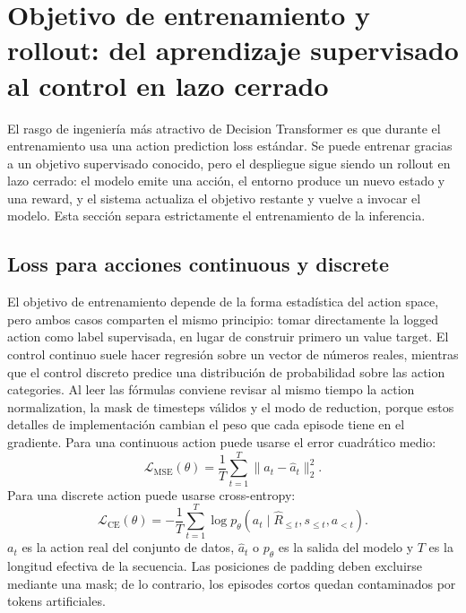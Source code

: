 \section{Objetivo de entrenamiento y rollout: del aprendizaje supervisado al control en lazo cerrado}

El rasgo de ingeniería más atractivo de Decision Transformer es que durante el entrenamiento usa una action prediction loss estándar. Se puede entrenar gracias a un objetivo supervisado conocido, pero el despliegue sigue siendo un rollout en lazo cerrado: el modelo emite una acción, el entorno produce un nuevo estado y una reward, y el sistema actualiza el objetivo restante y vuelve a invocar el modelo. Esta sección separa estrictamente el entrenamiento de la inferencia.

\subsection{Loss para acciones continuous y discrete}

El objetivo de entrenamiento depende de la forma estadística del action space, pero ambos casos comparten el mismo principio: tomar directamente la logged action como label supervisada, en lugar de construir primero un value target. El control continuo suele hacer regresión sobre un vector de números reales, mientras que el control discreto predice una distribución de probabilidad sobre las action categories. Al leer las fórmulas conviene revisar al mismo tiempo la action normalization, la mask de timesteps válidos y el modo de reduction, porque estos detalles de implementación cambian el peso que cada episode tiene en el gradiente. Para una continuous action puede usarse el error cuadrático medio:
\[
\mathcal{L}_{\mathrm{MSE}}(\theta)
=\frac{1}{T}\sum_{t=1}^{T}\lVert a_t-\widehat{a}_t\rVert_2^2.
\]
Para una discrete action puede usarse cross-entropy:
\[
\mathcal{L}_{\mathrm{CE}}(\theta)
=-\frac{1}{T}\sum_{t=1}^{T}\log p_{\theta}(a_t\mid \widehat{R}_{\le t},s_{\le t},a_{<t}).
\]
$a_t$ es la action real del conjunto de datos, $\widehat{a}_t$ o $p_{\theta}$ es la salida del modelo y $T$ es la longitud efectiva de la secuencia. Las posiciones de padding deben excluirse mediante una mask; de lo contrario, los episodes cortos quedan contaminados por tokens artificiales.


